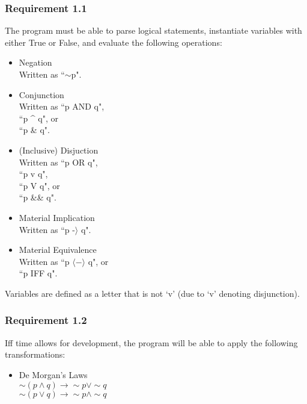 \documentclass{article}
\begin{document}
\subsubsection{Requirement 1.1}
The program must be able to parse logical statements, instantiate variables with either True or False, and evaluate the following operations:
\begin{itemize}
	\item Negation\\
		Written as ``$\sim$p".
	\item Conjunction\\
		Written as ``p AND q",\\
		``p \^{} q", or\\
		``p \& q".
	\item (Inclusive) Disjuction\\
		Written as ``p OR q",\\
		``p v q",\\
		``p V q", or\\
		``p \&\& q".
	\item Material Implication\\
		Written as ``p -$\rangle $ q".
	\item Material Equivalence\\
		Written as ``p $\langle-\rangle$ q", or\\
		``p IFF q".
\end{itemize}
Variables are defined as a letter that is not `v' (due to `v' denoting disjunction).

\subsubsection{Requirement 1.2}
Iff time allows for development, the program will be able to apply the following transformations:
\begin{itemize}
	\item De Morgan's Laws\\
	$\sim (p \land q) \to \sim p \lor \sim q$\\
	$\sim (p \lor q) \to \sim p \land \sim q$
\end{itemize}

\printbibliography
\end{document}
